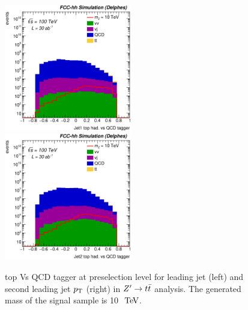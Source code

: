 \documentclass{cernrep}
\begin{document}
\begin{figure}[!htb]\centering
\includegraphics[width=0.495\textwidth]{Fig/Zptt/Jet1_thad_vs_QCD_tagger_sel0_nostack_log.eps}
\includegraphics[width=0.495\textwidth]{Fig/Zptt/Jet2_thad_vs_QCD_tagger_sel0_nostack_log.eps}
\caption{top Vs QCD tagger at preselection level for leading jet (left) and second leading jet $p\sb{\scriptstyle\mathrm{T}}$ (right) in $Z^{\prime} \rightarrow t\bar{t}$ analysis. The generated mass of the signal sample is 10 $\TeV$.}
\label{fig:Zptt_sel0_tagger}
\end{figure}
\end{document}
